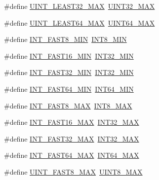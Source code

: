 \begin{DoxyCompactItemize}
\item 
\#define \hyperlink{stdint_8h_a70cad8bacc9a6db301e1cdc86cc8d571}{U\-I\-N\-T\-\_\-\-L\-E\-A\-S\-T32\-\_\-\-M\-A\-X}~\hyperlink{stdint_8h_ab5eb23180f7cc12b7d6c04a8ec067fdd}{U\-I\-N\-T32\-\_\-\-M\-A\-X}
\item 
\#define \hyperlink{stdint_8h_aab530113fa96e280e49c3c138b0f917d}{U\-I\-N\-T\-\_\-\-L\-E\-A\-S\-T64\-\_\-\-M\-A\-X}~\hyperlink{stdint_8h_a30654b4b67d97c42ca3f9b6052dda916}{U\-I\-N\-T64\-\_\-\-M\-A\-X}
\item 
\#define \hyperlink{stdint_8h_aad8fb982cb19143efd5ee9a1a7a89390}{I\-N\-T\-\_\-\-F\-A\-S\-T8\-\_\-\-M\-I\-N}~\hyperlink{stdint_8h_aadcf2a81af243df333b31efa6461ab8e}{I\-N\-T8\-\_\-\-M\-I\-N}
\item 
\#define \hyperlink{stdint_8h_a169460a4e2a79138723d68d99372d958}{I\-N\-T\-\_\-\-F\-A\-S\-T16\-\_\-\-M\-I\-N}~\hyperlink{stdint_8h_a688eb21a22db27c2b2bd5836943cdcbe}{I\-N\-T32\-\_\-\-M\-I\-N}
\item 
\#define \hyperlink{stdint_8h_ad93df1652ed0635513d5efe4f1219926}{I\-N\-T\-\_\-\-F\-A\-S\-T32\-\_\-\-M\-I\-N}~\hyperlink{stdint_8h_a688eb21a22db27c2b2bd5836943cdcbe}{I\-N\-T32\-\_\-\-M\-I\-N}
\item 
\#define \hyperlink{stdint_8h_a50f0fdcb00ea2500cec0f3d6d45c36f3}{I\-N\-T\-\_\-\-F\-A\-S\-T64\-\_\-\-M\-I\-N}~\hyperlink{stdint_8h_ab21f12f372f67b8ff0aa3432336ede67}{I\-N\-T64\-\_\-\-M\-I\-N}
\item 
\#define \hyperlink{stdint_8h_acbcdb3bee0f5f904da5df8de69a80ca3}{I\-N\-T\-\_\-\-F\-A\-S\-T8\-\_\-\-M\-A\-X}~\hyperlink{stdint_8h_aaf7f29f45f1a513b4748a4e5014ddf6a}{I\-N\-T8\-\_\-\-M\-A\-X}
\item 
\#define \hyperlink{stdint_8h_a2fd35d0ea091e04caec504ff0042cf00}{I\-N\-T\-\_\-\-F\-A\-S\-T16\-\_\-\-M\-A\-X}~\hyperlink{stdint_8h_a181807730d4a375f848ba139813ce04f}{I\-N\-T32\-\_\-\-M\-A\-X}
\item 
\#define \hyperlink{stdint_8h_ac96fa0f41b19e89f109e4f9913ca6635}{I\-N\-T\-\_\-\-F\-A\-S\-T32\-\_\-\-M\-A\-X}~\hyperlink{stdint_8h_a181807730d4a375f848ba139813ce04f}{I\-N\-T32\-\_\-\-M\-A\-X}
\item 
\#define \hyperlink{stdint_8h_a13c95cf9c209d8daacb36cbf0d5ba275}{I\-N\-T\-\_\-\-F\-A\-S\-T64\-\_\-\-M\-A\-X}~\hyperlink{stdint_8h_ad0d744f05898e32d01f73f8af3cd2071}{I\-N\-T64\-\_\-\-M\-A\-X}
\item 
\#define \hyperlink{stdint_8h_a2c6f97ea2d76d0cf6260c84046cdb44e}{U\-I\-N\-T\-\_\-\-F\-A\-S\-T8\-\_\-\-M\-A\-X}~\hyperlink{stdint_8h_aeb4e270a084ee26fe73e799861bd0252}{U\-I\-N\-T8\-\_\-\-M\-A\-X}

\end{DoxyCompactItemize}
